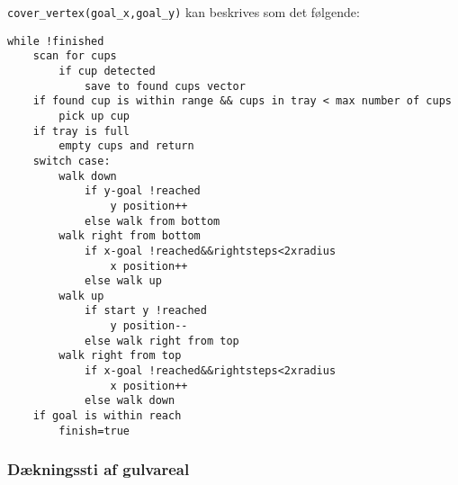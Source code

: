 \texttt{cover\_vertex(goal\_x,goal\_y)} kan beskrives som det følgende:
\begin{lstlisting}
while !finished
	scan for cups
		if cup detected
			save to found cups vector
	if found cup is within range && cups in tray < max number of cups
		pick up cup
	if tray is full
		empty cups and return
	switch case:
		walk down 
			if y-goal !reached
				y position++
			else walk from bottom
		walk right from bottom 
			if x-goal !reached&&rightsteps<2xradius
				x position++
			else walk up
		walk up
			if start y !reached
				y position--
			else walk right from top
		walk right from top
			if x-goal !reached&&rightsteps<2xradius
				x position++
			else walk down
	if goal is within reach
		finish=true
\end{lstlisting}

\subsubsection{Dækningssti af gulvareal}